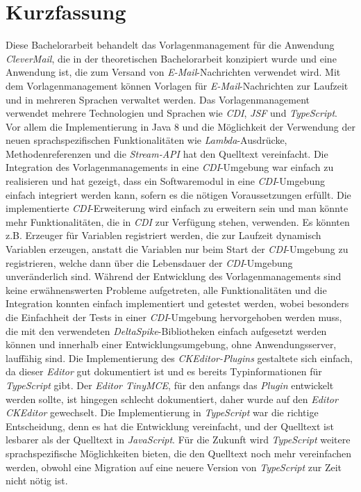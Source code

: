 \chapter{Kurzfassung}
Diese Bachelorarbeit behandelt das Vorlagenmanagement für die Anwendung \emph{CleverMail}, die in der theoretischen Bachelorarbeit konzipiert wurde und eine Anwendung ist, die zum Versand von \emph{E-Mail}-Nachrichten verwendet wird. Mit dem Vorlagenmanagement können Vorlagen für \emph{E-Mail}-Nachrichten zur Laufzeit und in mehreren Sprachen verwaltet werden.
\newline
\newline
Das Vorlagenmanagement verwendet mehrere Technologien und Sprachen wie \emph{CDI}, \emph{JSF} und \emph{TypeScript}. Vor allem die Implementierung in Java 8 und die Möglichkeit der Verwendung der neuen sprachspezifischen Funktionalitäten wie \emph{Lambda}-Ausdrücke, Methodenreferenzen und die \emph{Stream-API} hat den Quelltext vereinfacht.
\newline
\newline
Die Integration des Vorlagenmanagements in eine \emph{CDI}-Umgebung war einfach zu realisieren und hat gezeigt, dass ein Softwaremodul in eine \emph{CDI}-Umgebung einfach integriert werden kann, sofern es die nötigen Voraussetzungen erfüllt. Die implementierte \emph{CDI}-Erweiterung wird einfach zu erweitern sein und man könnte mehr Funktionalitäten, die in \emph{CDI} zur Verfügung stehen, verwenden. Es könnten z.B. Erzeuger für Variablen registriert werden, die zur Laufzeit dynamisch Variablen erzeugen, anstatt die Variablen nur beim Start der \emph{CDI}-Umgebung zu registrieren, welche dann über die Lebensdauer der \emph{CDI}-Umgebung  unveränderlich sind. 
\newline
\newline
Während der Entwicklung des Vorlagenmanagements sind keine erwähnenswerten Probleme aufgetreten, alle Funktionalitäten und die Integration konnten einfach implementiert und getestet werden, wobei besonders die Einfachheit der Tests in einer \emph{CDI}-Umgebung hervorgehoben werden muss, die mit den verwendeten \emph{DeltaSpike}-Bibliotheken einfach aufgesetzt werden können und innerhalb einer Entwicklungsumgebung, ohne Anwendungsserver, lauffähig sind.
\newline
\newline
Die Implementierung des \emph{CKEditor-Plugins} gestaltete sich einfach, da dieser \emph{Editor} gut dokumentiert ist und es bereits Typinformationen für \emph{TypeScript} gibt. Der \emph{Editor TinyMCE}, für den anfangs das \emph{Plugin} entwickelt werden sollte, ist hingegen schlecht dokumentiert, daher wurde auf den \emph{Editor CKEditor} gewechselt. Die Implementierung in \emph{TypeScript} war die richtige Entscheidung, denn es hat die Entwicklung vereinfacht, und der Quelltext ist lesbarer als der Quelltext in \emph{JavaScript}. Für die Zukunft wird \emph{TypeScript} weitere sprachspezifische Möglichkeiten bieten, die den Quelltext noch mehr vereinfachen werden, obwohl eine Migration auf eine neuere Version von \emph{TypeScript} zur Zeit nicht nötig ist.